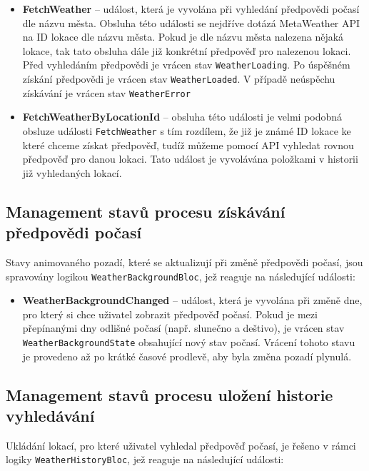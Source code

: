 \documentclass[12pt, a4paper]{article}
\begin{document}
\begin{itemize}
	\item \textbf{FetchWeather} -- událost, která je vyvolána při vyhledání předpovědi počasí dle názvu města. Obsluha této události se nejdříve dotázá MetaWeather API na ID lokace dle názvu města. Pokud je dle názvu města nalezena nějaká lokace, tak tato obsluha dále již konkrétní předpověď pro nalezenou lokaci. Před vyhledáním předpovědi je vrácen stav \texttt{WeatherLoading}. Po úspěšném získání předpovědi je vrácen stav \texttt{WeatherLoaded}. V případě neúspěchu získávání je vrácen stav \texttt{WeatherError}
	\item \textbf{FetchWeatherByLocationId} -- obsluha této události je velmi podobná obsluze události \texttt{FetchWeather} s tím rozdílem, že již je známé ID lokace ke které chceme získat předpověď, tudíž můžeme pomocí API vyhledat rovnou předpověď pro danou lokaci. Tato událost je vyvolávána položkami v historii již vyhledaných lokací.

\end{itemize}

\subsection{Management stavů procesu získávání předpovědi počasí}

Stavy animovaného pozadí, které se aktualizují při změně předpovědi počasí, jsou spravovány logikou \texttt{WeatherBackgroundBloc}, jež reaguje na následující události:

\begin{itemize}

	\item \textbf{WeatherBackgroundChanged} -- událost, která je vyvolána při změně dne, pro který si chce uživatel zobrazit předpověď počasí. Pokud je mezi přepínanými dny odlišné počasí (např. slunečno a deštivo), je vrácen stav \texttt{WeatherBackgroundState} obsahující nový stav počasí. Vrácení tohoto stavu je provedeno až po krátké časové prodlevě, aby byla změna pozadí plynulá.

\end{itemize}


\subsection{Management stavů procesu uložení historie vyhledávání}

Ukládání lokací, pro které uživatel vyhledal předpověď počasí, je řešeno v rámci logiky \texttt{WeatherHistoryBloc}, jež reaguje na následující události:
\end{document}
